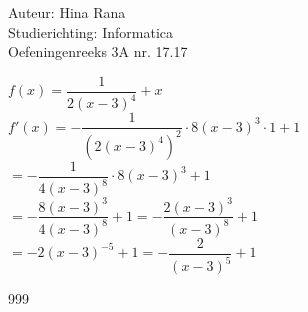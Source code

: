 \documentclass[a4paper]{article}
\begin{document}
\noindent \large Auteur: Hina Rana \\
\noindent \large Studierichting: Informatica\\
\noindent \large Oefeningenreeks 3A nr. 17.17\\

\medskip

\normalsize

$f(x) = \dfrac{1}{2(x-3)^4}+x$\\

$f'(x) = -\dfrac{1}{(2(x-3)^4)^2} \cdot 8(x-3)^3 \cdot 1 +1$\\

$= -\dfrac{1}{4(x-3)^8}\cdot 8(x-3)^3 +1$\\ 

$= -\dfrac{8(x-3)^3}{4(x-3)^8} +1 = -\dfrac{2(x-3)^3}{(x-3)^8} +1$\\

$= -2(x-3)^{-5} +1 = -\dfrac{2}{(x-3)^5} + 1$

\begin{thebibliography}{999}
\end{thebibliography}
\end{document}
